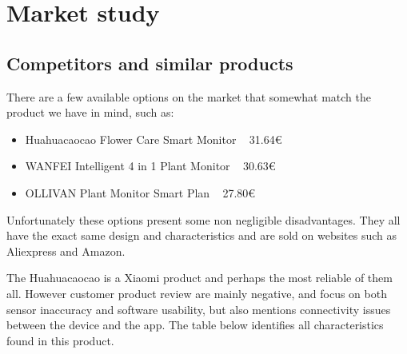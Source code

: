 \section{Market study}

\subsection{Competitors and similar products}
There are a few available options on the market that somewhat match the product
we have in mind, such as:

\begin{itemize}
    \item Huahuacaocao Flower Care Smart Monitor ~ 31.64€
    \item WANFEI Intelligent 4 in 1 Plant Monitor ~ 30.63€
    \item OLLIVAN Plant Monitor Smart Plan ~ 27.80€
\end{itemize}

Unfortunately these options present some non negligible disadvantages. They all
have the exact same design and characteristics and are sold on websites such as
Aliexpress and Amazon. 

The Huahuacaocao is a Xiaomi product and perhaps the most reliable of them all.
However customer product review are mainly negative, and focus on both sensor inaccuracy
and software usability, but also mentions connectivity issues between the device
and the app. The table below identifies all characteristics found in this product. 


